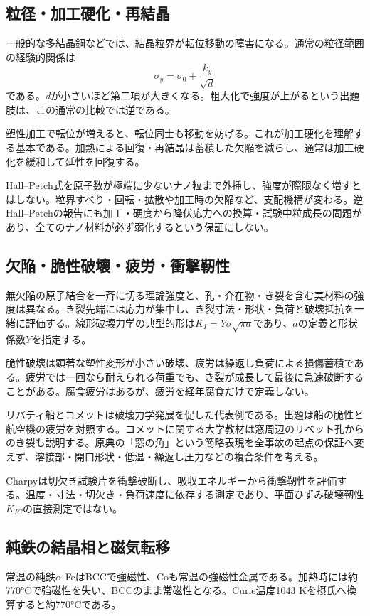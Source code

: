 \subsection{粒径・加工硬化・再結晶}
\label{theory:material:strengthening}
一般的な多結晶鋼などでは、結晶粒界が転位移動の障害になる。通常の粒径範囲の経験的関係は
\[
 \sigma_y=\sigma_0+\frac{k_y}{\sqrt d}
\]
である。\(d\)が小さいほど第二項が大きくなる。粗大化で強度が上がるという出題肢は、この通常の比較では逆である。

塑性加工で転位が増えると、転位同士も移動を妨げる。これが加工硬化を理解する基本である。加熱による回復・再結晶は蓄積した欠陥を減らし、通常は加工硬化を緩和して延性を回復する\cite{mit_material_dislocations2001}。

Hall--Petch式を原子数が極端に少ないナノ粒まで外挿し、強度が際限なく増すとはしない。粒界すべり・回転・拡散や加工時の欠陥など、支配機構が変わる。逆Hall--Petchの報告にも加工・硬度から降伏応力への換算・試験中粒成長の問題があり、全てのナノ材料が必ず弱化するという保証にしない\cite{hall_petch_limits2020}。

\subsection{欠陥・脆性破壊・疲労・衝撃靭性}
\label{theory:material:fracture}
無欠陥の原子結合を一斉に切る理論強度と、孔・介在物・き裂を含む実材料の強度は異なる。き裂先端には応力が集中し、き裂寸法・形状・負荷と破壊抵抗を一緒に評価する。線形破壊力学の典型的形は\(K_I=Y\sigma\sqrt{\pi a}\)であり、\(a\)の定義と形状係数\(Y\)を指定する。

脆性破壊は顕著な塑性変形が小さい破壊、疲労は繰返し負荷による損傷蓄積である。疲労では一回なら耐えられる荷重でも、き裂が成長して最後に急速破断することがある\cite{mit_material_fatigue2001}。腐食疲労はあるが、疲労を経年腐食だけで定義しない。

リバティ船とコメットは破壊力学発展を促した代表例である\cite{nist_fracture_history2010}。出題は船の脆性と航空機の疲労を対照する。コメットに関する大学教材は窓周辺のリベット孔からのき裂も説明する\cite{mit_material_fracture2001}。原典の「窓の角」という簡略表現を全事故の起点の保証へ変えず、溶接部・開口形状・低温・繰返し圧力などの複合条件を考える。

Charpyは切欠き試験片を衝撃破断し、吸収エネルギーから衝撃靭性を評価する。温度・寸法・切欠き・負荷速度に依存する測定であり、平面ひずみ破壊靭性\(K_{IC}\)の直接測定ではない\cite{nist_charpy}。

\subsection{純鉄の結晶相と磁気転移}
\label{theory:material:ironphases}
常温の純鉄\(\alpha\)-FeはBCCで強磁性、Coも常温の強磁性金属である\cite{princeton_iron,openstax_magnetism}。加熱時には約770°Cで強磁性を失い、BCCのまま常磁性となる。Curie温度1043 Kを摂氏へ換算すると約770°Cである\cite{iron_curie1954}。

